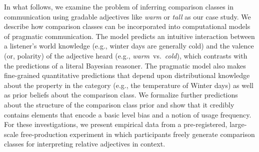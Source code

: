 \documentclass[doc, floatsintext]{apa6}
\begin{document}
In what follows, we examine the problem of inferring comparison classes in communication using gradable adjectives like \emph{warm} or \emph{tall} as our case study. 
We describe how comparison classes can be incorporated into computational models of pragmatic communication.
The model predicts an intuitive interaction between a listener's world knowledge (e.g., winter days are generally cold) and the valence (or, polarity) of the adjective heard (e.g., \emph{warm}~vs.~\emph{cold}), which contrasts with the predictions of a literal Bayesian reasoner. 
The pragmatic model also makes fine-grained quantitative predictions that depend upon distributional knowledge about the property in the category (e.g., the temperature of Winter days) as well as prior beliefs about the comparison class.
We formalize further predictions about the structure of the comparison class prior and show that it credibly contains elements that encode a basic level bias \cite{rosch1975family} and a notion of usage frequency.
For these investigations, we present empirical data from a pre-registered, large-scale free-production experiment in which participants freely generate comparison classes for interpreting relative adjectives in context.


















\end{document}
